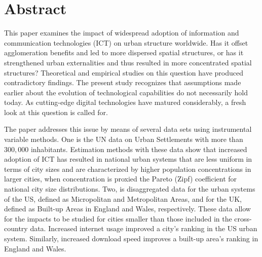 \documentclass[10pt,letterpaper]{article}
\newcommand{\getIndex}[2]{
  \ForEach{,}{\IfEq{#1}{\thislevelitem}{\number\thislevelcount\ExitForEach}{}}{#2}
}
\newcommand{\getAff}[1]{
  \getIndex{#1}{University of Bristol and The Alan Turing Institute,Tufts University}
}
\begin{document}
\vspace*{0.2in}

\section*{Abstract}
This paper examines the impact of widespread adoption of information and
communication technologies (ICT) on urban structure worldwide. Has it
offset agglomeration benefits and led to more dispersed spatial
structures, or has it strengthened urban externalities and thus resulted
in more concentrated spatial structures? Theoretical and empirical
studies on this question have produced contradictory findings. The
present study recognizes that assumptions made earlier about the
evolution of technological capabilities do not necessarily hold today.
As cutting-edge digital technologies have matured considerably, a fresh
look at this question is called for.

The paper addresses this issue by means of several data sets using
instrumental variable methods. One is the UN data on Urban Settlements
with more than \(300,000\) inhabitants. Estimation methods with these
data show that increased adoption of ICT has resulted in national urban
systems that are less uniform in terms of city sizes and are
characterized by higher population concentrations in larger cities, when
concentration is proxied the Pareto (Zipf) coefficient for national city
size distributions. Two, is disaggregated data for the urban systems of
the US, defined as Micropolitan and Metropolitan Areas, and for the UK,
defined as Built-up Areas in England and Wales, respectively. These data
allow for the impacts to be studied for cities smaller than those
included in the cross-country data. Increased internet usage improved a
city's ranking in the US urban system. Similarly, increased download
speed improves a built-up area's ranking in England and Wales.
\end{document}
